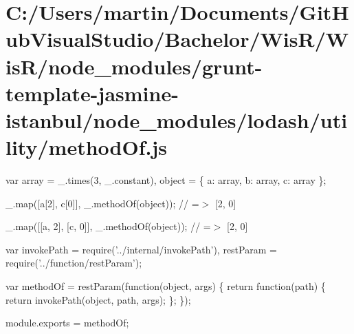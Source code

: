 \hypertarget{_c_1_2_users_2martin_2_documents_2_git_hub_visual_studio_2_bachelor_2_wis_r_2_wis_r_2node_module4605af2c45ab3e08195d9ab1e38a0883}{}\section{C\+:/\+Users/martin/\+Documents/\+Git\+Hub\+Visual\+Studio/\+Bachelor/\+Wis\+R/\+Wis\+R/node\+\_\+modules/grunt-\/template-\/jasmine-\/istanbul/node\+\_\+modules/lodash/utility/method\+Of.\+js}
var array = \+\_\+.\+times(3, \+\_\+.\+constant), object = \{ \textquotesingle{}a\textquotesingle{}\+: array, \textquotesingle{}b\textquotesingle{}\+: array, \textquotesingle{}c\textquotesingle{}\+: array \};

\+\_\+.\+map(\mbox{[}\textquotesingle{}a\mbox{[}2\mbox{]}\textquotesingle{}, \textquotesingle{}c\mbox{[}0\mbox{]}\textquotesingle{}\mbox{]}, \+\_\+.\+method\+Of(object)); // =$>$ \mbox{[}2, 0\mbox{]}

\+\_\+.\+map(\mbox{[}\mbox{[}\textquotesingle{}a\textquotesingle{}, \textquotesingle{}2\textquotesingle{}\mbox{]}, \mbox{[}\textquotesingle{}c\textquotesingle{}, \textquotesingle{}0\textquotesingle{}\mbox{]}\mbox{]}, \+\_\+.\+method\+Of(object)); // =$>$ \mbox{[}2, 0\mbox{]}


\begin{DoxyCodeInclude}
var invokePath = require(\textcolor{stringliteral}{'../internal/invokePath'}),
    restParam = require(\textcolor{stringliteral}{'../function/restParam'});

var methodOf = restParam(\textcolor{keyword}{function}(\textcolor{keywordtype}{object}, args) \{
  \textcolor{keywordflow}{return} \textcolor{keyword}{function}(path) \{
    \textcolor{keywordflow}{return} invokePath(\textcolor{keywordtype}{object}, path, args);
  \};
\});

module.exports = methodOf;
\end{DoxyCodeInclude}
 